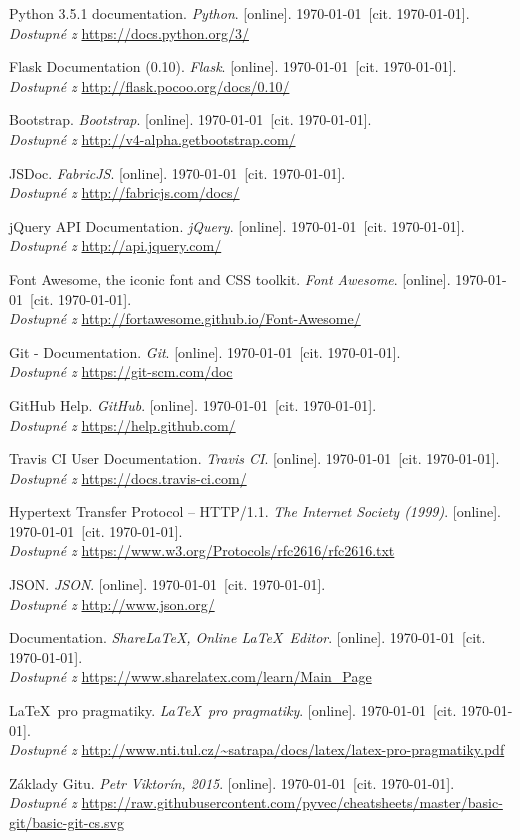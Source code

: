 
\newcommand{\wwwbibitem}[3]{%
	#1. \textit{#2}. [online]. \bibciteformat\today\ [cit. \today].\\
	\emph{Dostupné z} \href{#3}{#3}%
}

\begin{thebibliography}{00}
	\wwwbibitem{Python 3.5.1 documentation}{Python}{https://docs.python.org/3/}

	\wwwbibitem{Flask Documentation (0.10)}{Flask}{http://flask.pocoo.org/docs/0.10/}

	\wwwbibitem{Bootstrap}{Bootstrap}{http://v4-alpha.getbootstrap.com/}

	\wwwbibitem{JSDoc}{FabricJS}{http://fabricjs.com/docs/}

	\wwwbibitem{jQuery API Documentation}{jQuery}{http://api.jquery.com/}

	\wwwbibitem{Font Awesome, the iconic font and CSS toolkit}{Font Awesome}{http://fortawesome.github.io/Font-Awesome/}

	\wwwbibitem{Git - Documentation}{Git}{https://git-scm.com/doc}

	\wwwbibitem{GitHub Help}{GitHub}{https://help.github.com/}

	\wwwbibitem{Travis CI User Documentation}{Travis CI}{https://docs.travis-ci.com/}

	\wwwbibitem{Hypertext Transfer Protocol -- HTTP/1.1}{The Internet Society (1999)}{https://www.w3.org/Protocols/rfc2616/rfc2616.txt}

	\wwwbibitem{JSON}{JSON}{http://www.json.org/}

	\wwwbibitem{Documentation}{Share\LaTeX, Online \LaTeX\ Editor}{https://www.sharelatex.com/learn/Main\_Page}

	\wwwbibitem{\LaTeX\ pro pragmatiky}{\LaTeX\ pro pragmatiky}{http://www.nti.tul.cz/\textasciitilde{}satrapa/docs/latex/latex-pro-pragmatiky.pdf}

	\wwwbibitem{Základy Gitu}{Petr Viktorín, 2015}{https://raw.githubusercontent.com/pyvec/cheatsheets/master/basic-git/basic-git-cs.svg}
\end{thebibliography}
